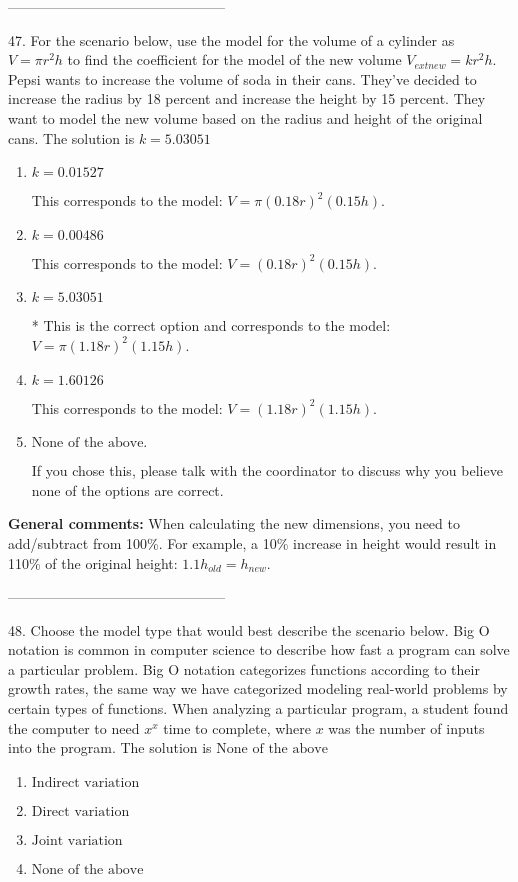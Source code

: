 \documentclass{extbook}[14pt]
\begin{document}
-----------------------------------------------

47. For the scenario below, use the model for the volume of a cylinder as $V = \pi r^2 h$ to find the coefficient for the model of the new volume $V_{	ext{new}} = k r^2 h$.
Pepsi wants to increase the volume of soda in their cans. They've decided to increase the radius by 18 percent and increase the height by 15 percent. They want to model the new volume based on the radius and height of the original cans. 
The solution is $ k = 5.03051 $ 

\begin{enumerate}[label=\Alph*.] 
\item $ k = 0.01527 $ 

 This corresponds to the model: $V = \pi (0.18 r)^2 (0.15 h)$. 
\item $ k = 0.00486 $ 

 This corresponds to the model: $V = (0.18 r)^2 (0.15 h)$. 
\item $ k = 5.03051 $ 

 * This is the correct option and corresponds to the model: $V = \pi (1.18 r)^2 (1.15 h)$. 
\item $ k = 1.60126 $ 

 This corresponds to the model: $V = (1.18 r)^2 (1.15 h)$. 
\item $ \text{None of the above.} $ 

 If you chose this, please talk with the coordinator to discuss why you believe none of the options are correct. 
\end{enumerate} 
 
\textbf{General comments:} When calculating the new dimensions, you need to add/subtract from 100\%. For example, a 10\% increase in height would result in 110\% of the original height: $1.1h_{old} = h_{new}$.

-----------------------------------------------

48. Choose the model type that would best describe the scenario below.
Big O notation is common in computer science to describe how fast a program can solve a particular problem. Big O notation categorizes functions according to their growth rates, the same way we have categorized modeling real-world problems by certain types of functions. When analyzing a particular program, a student found the computer to need $x^x$ time to complete, where $x$ was the number of inputs into the program. 
The solution is $ \text{None of the above} $ 

\begin{enumerate}[label=\Alph*.] 
\item $ \text{Indirect variation} $ 

  
\item $ \text{Direct variation} $ 

  
\item $ \text{Joint variation} $ 

  
\item $ \text{None of the above} $ 

  
\end{enumerate} 
 
\end{document}

